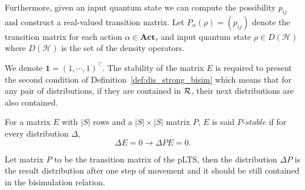 \documentclass[runningheads]{llncs}
\begin{document}
Furthermore, given an input quantum state we can compute the possibility $p_{ij}$ and construct a real-valued transition matrix. Let $P_{\alpha}(\rho)=(p_{ij})$ denote the transition matrix for each action $\alpha\in\textbf{Act}_{\tau}$ and input quantum state $\rho\in D(\mathcal{H})$ where $D(\mathcal{H})$ is the set of the density operators. 

We denote $\textbf{1}=(1,\cdots,1)^{\top}$. 
The stability of the matrix $E$ is required to present the second condition of Definition~\ref{def:dis_strong_bisim} which means that for any pair of distributions, if they are contained in $\mathrel{{\mathcal R }}$, their next distributions are also contained.

\begin{definition}\label{def:p_stable}
For a matrix $E$ with $|S|$ rows and a $|S|\times|S|$ matrix $P$, $E$ is said $P\text{-}stable$ if for every distribution $\Delta$,
\[\Delta E = 0\longrightarrow\Delta P E = 0.\]
\end{definition}

Let matrix $P$ to be the transition matrix of the pLTS, then the distribution $\Delta P$ is the result distribution after one step of movement and it should be still contained in the bisimulation relation. 
\end{document}
